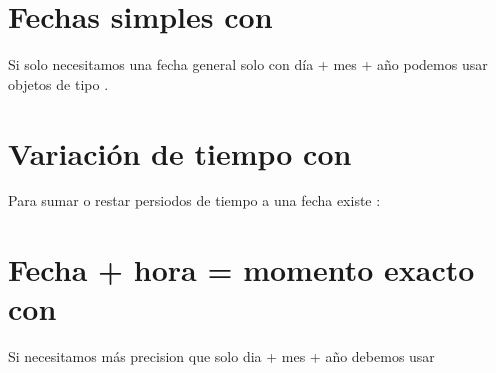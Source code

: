 \documentclass[a4paper,12pt,spanish]{sphinxmanual}
\begin{document}
\section{Fechas simples con }
\label{\detokenize{datetime:fechas-simples-con-date}}
\sphinxAtStartPar
Si solo necesitamos una fecha general solo con día + mes + año podemos usar
objetos de tipo .

\begin{sphinxVerbatim}[commandchars=\\\{\}]
   

  

    
\end{sphinxVerbatim}


\section{Variación de tiempo con }
\label{\detokenize{datetime:variacion-de-tiempo-con-timedelta}}
\sphinxAtStartPar
Para sumar o restar persiodos de tiempo a una fecha existe :

\begin{sphinxVerbatim}[commandchars=\\\{\}]
    
  
    
\end{sphinxVerbatim}


\section{Fecha + hora = momento exacto con }
\label{\detokenize{datetime:fecha-hora-momento-exacto-con-datetime}}
\sphinxAtStartPar
Si necesitamos más precision que solo dia + mes + año debemos usar 
\end{document}
